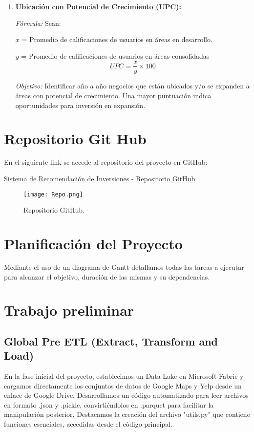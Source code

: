 \documentclass[12pt]{article}
\begin{document}
\begin{enumerate}
    \item \textbf{Ubicación con Potencial de Crecimiento (UPC):}
    
    \textit{Fórmula:} Sean:

    $x$ = Promedio de calificaciones de usuarios en áreas en desarrollo.
    
    $y$ = Promedio de calificaciones de usuarios en áreas consolidadas
    $$ UPC = \frac{x}{y}\times 100$$
    
    \textit{Objetivo:} Identificar año a año negocios que están ubicados y/o se expanden a áreas con potencial de crecimiento. Una mayor puntuación indica oportunidades para inversión en expansión.
    
\end{enumerate}

\section{Repositorio Git Hub}

En el siguiente link se accede al repositorio del proyecto en GitHub:

\href{https://github.com/leocortes85/Invesment_Recomendation_Project}{Sistema de Recomendación de Inversiones - Repositorio GitHub}

\begin{figure}[H]
  \centering
  \texttt{[image: Repo.png]}
  \caption{Repositorio GitHub.}
  \label{fig:Repositorio GitHub}
\end{figure}

\section{Planificación del Proyecto}

Mediante el uso de un diagrama de Gantt detallamos todas las tareas a ejecutar para alcanzar el objetivo, duración de las mismas y su dependencias.



\section{Trabajo preliminar}
\subsection{Global Pre ETL (Extract, Transform and Load)}
En la fase inicial del proyecto, establecimos un Data Lake en Microsoft Fabric y cargamos directamente los conjuntos de datos de Google Maps y Yelp desde un enlace de Google Drive. Desarrollamos un código automatizado para leer archivos en formato .json y .pickle, convirtiéndolos en .parquet para facilitar la manipulación posterior. Destacamos la creación del archivo "utils.py" que contiene funciones esenciales, accedidas desde el código principal.
\end{document}
